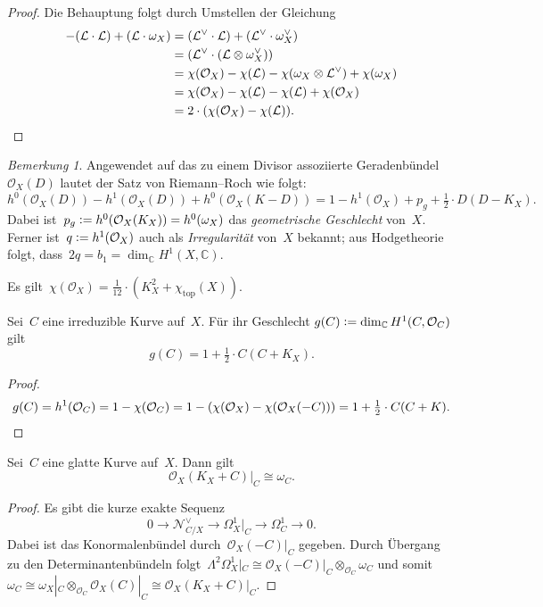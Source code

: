 \documentclass[a4paper,ngerman,12pt]{scrartcl}
\theoremstyle{definition}
\theoremstyle{plain}
\theoremstyle{remark}
\newtheorem{rem}[defn]{Bemerkung}
\newcommand{\CC}{\mathbb{C}}
\newcommand{\N}{\mathcal{N}}
\renewcommand{\L}{\mathcal{L}}
\renewcommand{\O}{\mathcal{O}}
\newcommand{\lra}{\longrightarrow}
\newcommand{\defeq}{\vcentcolon=}
\begin{document}
\begin{proof}Die Behauptung folgt durch Umstellen der Gleichung
\begin{align*}
  -(\L \cdot \L) + (\L \cdot \omega_X)
  &= (\L^\vee \cdot \L) + (\L^\vee \cdot \omega_X^\vee) \\
  &= (\L^\vee \cdot (\L \otimes \omega_X^\vee)) \\
  &= \chi(\O_X) - \chi(\L) - \chi(\omega_X \otimes \L^\vee) + \chi(\omega_X) \\
  &= \chi(\O_X) - \chi(\L) - \chi(\L) + \chi(\O_X) \\
  &= 2 \cdot (\chi(\O_X) - \chi(\L)). \qedhere
\end{align*}
\end{proof}

\begin{rem}Angewendet auf das zu einem Divisor assoziierte
Geradenbündel~$\O_X(D)$ lautet der Satz von Riemann--Roch wie folgt:
\[ h^0(\O_X(D)) - h^1(\O_X(D)) + h^0(\O_X(K-D)) =
  1 - h^1(\O_X) + p_g + \tfrac{1}{2} \cdot D(D-K_X). \]
Dabei ist~$p_g \defeq h^0(\O_X(K_X)) = h^0(\omega_X)$ das \emph{geometrische
Geschlecht} von~$X$. Ferner ist~$q \defeq h^1(\O_X)$ auch als \emph{Irregularität}
von~$X$ bekannt; aus Hodgetheorie folgt, dass~$2q = b_1 = \dim_\CC H^1(X,\CC)$.
\end{rem}

\begin{fact}
Es gilt~$\chi(\O_X) = \frac{1}{12} \cdot (K_X^2 +
\chi_\mathrm{top}(X))$.
\end{fact}

\begin{cor}[Geschlechtsformel]
Sei~$C$ eine irreduzible Kurve auf~$X$. Für ihr Geschlecht $g(C) \defeq
\dim_\CC H^1(C,\O_C)$ gilt
\[ g(C) = 1 + \tfrac{1}{2} \cdot C(C+K_X). \]
\end{cor}
\begin{proof}\[ g(C) = h^1(\O_C) = 1 - \chi(\O_C) = 1 - (\chi(\O_X) -
\chi(\O_X(-C))) = 1 + \tfrac{1}{2} \cdot C(C+K). \qedhere \]
\end{proof}

\begin{prop}[Adjunktionsformel]
Sei~$C$ eine glatte Kurve auf~$X$. Dann gilt \[ \O_X(K_X+C)|_C \cong \omega_C. \]
\end{prop}
\begin{proof}Es gibt die kurze exakte Sequenz
\[ 0 \lra \N_{C/X}^\vee \lra \Omega^1_X|_C \lra \Omega^1_C \lra 0. \]
Dabei ist das Konormalenbündel durch~$\O_X(-C)|_C$ gegeben. Durch Übergang zu
den Determinantenbündeln folgt~$\Lambda^2\Omega^1_X|_C \cong
\O_X(-C)|_C \otimes_{\O_C} \omega_C$ und somit~$\omega_C \cong \omega_X|_C
\otimes_{\O_C} \O_X(C)|_C \cong \O_X(K_X+C)|_C$.
\end{proof}

\end{document}
